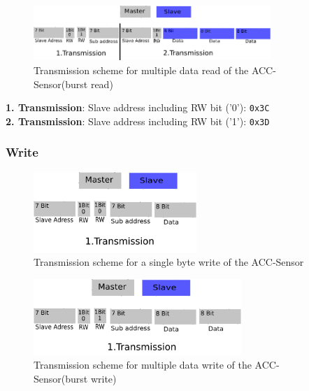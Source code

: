 \begin{itemize}
\begin{itemize}
\begin{figure}[H]
	\centering\includegraphics[width=0.8\textwidth]{fig/I2C_Adressing/ACC_read_multiple}
	\caption[Scheme for multiple data read of the ACC-Sensor]{Transmission scheme for multiple data read of the ACC-Sensor(burst read)}
	\label{fig:ACC2}
\end{figure}

\textbf{1. Transmission}: Slave address including RW bit ('0'): \texttt{0x3C}\\
\textbf{2. Transmission}: Slave address including RW bit ('1'): \texttt{0x3D}

\subsubsection{Write}
\label{subsubsec:ACCwrite}

\begin{figure}[H]
	\centering\includegraphics[width=0.55\textwidth]{fig/I2C_Adressing/ACC_write_single}
	\caption[Scheme for a single byte write of the ACC-Sensor]{Transmission scheme for a single byte write of the ACC-Sensor}
	\label{fig:ACC3}
\end{figure}

\begin{figure}[H]
	\centering\includegraphics[width=0.7\textwidth]{fig/I2C_Adressing/ACC_write_multiple}
	\caption[Scheme for multiple data write of the ACC-Sensor]{Transmission scheme for multiple data write of the ACC-Sensor(burst write)}
	\label{fig:ACC4}
\end{figure}


\end{itemize}
\end{itemize}
